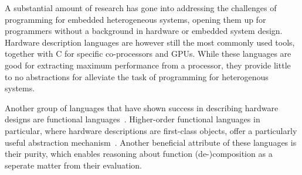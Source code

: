 \documentclass[../main.tex]{subfiles}
\begin{document}


A substantial amount of research has gone into addressing the challenges of programming for embedded heterogeneous systems, opening them up for programmers without a background in hardware or embedded system design. Hardware description languages are however still the most commonly used tools, together with C for specific co-processors and GPUs. While these languages are good for extracting maximum performance from a processor, they provide little to no abstractions for alleviate the task of programming for heterogenous systems.




Another group of languages that have shown success in describing hardware designs are functional languages~\cite{sheeran2005}. Higher-order functional languages in particular, where hardware descriptions are first-class objects, offer a particularly useful abstraction mechanism~\cite{baaij2010, bjesse1998, gill2010}. Another beneficial attribute of these languages is their purity, which enables reasoning about function (de-)composition as a seperate matter from their evaluation. 
\end{document}
